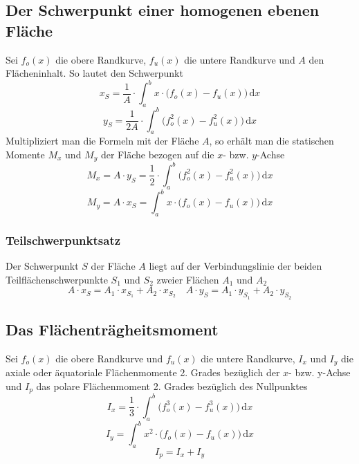 \subsection{Der Schwerpunkt einer homogenen ebenen Fläche}
Sei $f_o\left(x\right)$ die obere Randkurve, $f_u\left(x\right)$ die untere Randkurve und $A$ den Flächeninhalt. So lautet den Schwerpunkt
\begin{equation} 
\boxed{x_S=\dfrac{1}{A}\cdot \displaystyle \int_a^bx\cdot \Big(f_o\left(x\right)-f_u\left(x\right)\Big)\,\text{d}x}
\end{equation} 
\begin{equation} 
\boxed{y_S=\dfrac{1}{2A}\cdot \displaystyle \int_a^b\Big(f_o^2\left(x\right)-f_u^2\left(x\right)\Big)\,\text{d}x}
\end{equation} 
Multipliziert man die Formeln mit der Fläche $A$, so erhält man die statischen Momente $M_x$ und $M_y$ der Fläche bezogen auf die $x$- bzw. $y$-Achse
\begin{equation}  
\boxed{M_x=A\cdot y_S=\dfrac{1}{2}\cdot \displaystyle \int_a^b\Big(f_o^2\left(x\right)-f_u^2\left(x\right)\Big)\,\text{d}x}
\end{equation}
\begin{equation}
\boxed{M_y=A\cdot x_S=\displaystyle \int_a^bx\cdot \Big(f_o\left(x\right)-f_u\left(x\right)\Big)\,\text{d}x}
\end{equation}
\subsubsection{Teilschwerpunktsatz}
Der Schwerpunkt $S$ der Fläche $A$ liegt auf der Verbindungslinie der beiden Teilflächenschwerpunkte $S_1$ und $S_2$ zweier Flächen $A_1$ und $A_2$
\begin{equation}
\boxed{A\cdot x_S=A_1\cdot x_{S_1}+A_2\cdot x_{S_2}}\quad \boxed{A\cdot y_S=A_1\cdot y_{S_1}+A_2\cdot y_{S_2}}
\end{equation}
\subsection{Das Flächenträgheitsmoment}
Sei $f_o\left(x\right)$ die obere Randkurve und $f_u\left(x\right)$ die untere Randkurve, $I_x$ und $I_y$ die axiale oder äquatoriale Flächenmomente 2. Grades bezüglich der $x$- bzw. y-Achse und $I_p$ das polare Flächenmoment 2. Grades bezüglich des Nullpunktes 
\begin{equation}
\boxed{I_x=\dfrac{1}{3}\cdot \displaystyle \int_a^b\Big(f_o^3\left(x\right)-f_u^3\left(x\right)\Big)\,\text{d}x}
\end{equation}
\begin{equation}
\boxed{I_y=\displaystyle \int_a^bx^2\cdot \Big(f_o\left(x\right)-f_u\left(x\right)\Big)\,\text{d}x}
\end{equation}
\begin{equation}
\boxed{I_p=I_x+I_y}
\end{equation}
